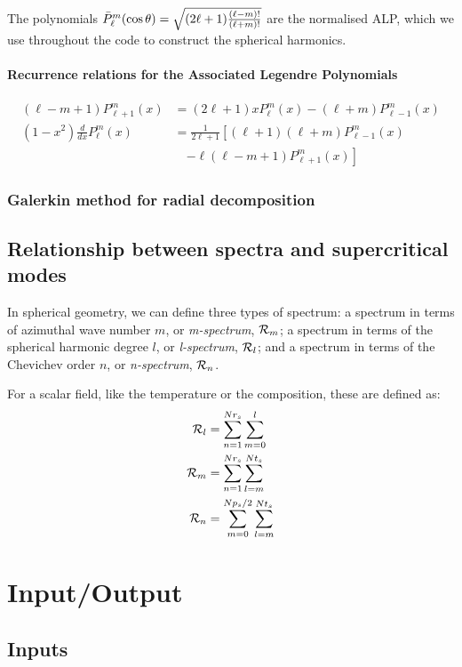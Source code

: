 \documentclass[a4paper,10pt]{book}
\begin{document}
The polynomials $\bar{P}_\ell^m ( \cos{\theta} ) = \sqrt{{(2\ell+1) }{(\ell-m)!\over (\ell+m)!}}$
are the normalised ALP, which we use throughout the code to construct the spherical harmonics.


\subsubsection{Recurrence relations for the Associated Legendre Polynomials}
\begin{align}
 (\ell-m+1)P_{\ell+1}^{m}(x) &= (2\ell+1)xP_{\ell}^{m}(x) - (\ell+m)P_{\ell-1}^{m}(x)\\
 (1-x^2)\frac{d}{dx}{P_\ell^m}(x) &= \frac1{2\ell+1}
  \left[ (\ell+1)(\ell+m)P_{\ell-1}^m(x) \right. \nonumber \\
   &\quad \left. - \ell(\ell-m+1)P_{\ell+1}^m(x) \right]
\end{align}

\subsection{Galerkin method for radial decomposition}

\section{Relationship between spectra and supercritical modes}
\label{s:spectra_defs}
In spherical geometry, we can define three types of spectrum: a spectrum in
terms of azimuthal wave number $m$, or {\em m-spectrum}, ${\cal R}_m$; a
spectrum in terms of the spherical harmonic degree $l$, or {\em l-spectrum},
${\cal R}_l$; and a spectrum in terms of the Chevichev order $n$, or
{\em n-spectrum}, ${\cal R}_n$.

For a scalar field, like the temperature or the composition, these are defined
as:
\begin{align}
{\cal R}_l & = \sum_{n=1}^{Nr_s}\sum_{m=0}^l  \\
{\cal R}_m & = \sum_{n=1}^{Nr_s}\sum_{l=m}^{Nt_s}  \\
{\cal R}_n & = \sum_{m=0}^{Np_s/2}\sum_{l=m}^{Nt_s}
\end{align}

\chapter{Input/Output}

\section{Inputs}
\label{s:inputs}
\end{document}
